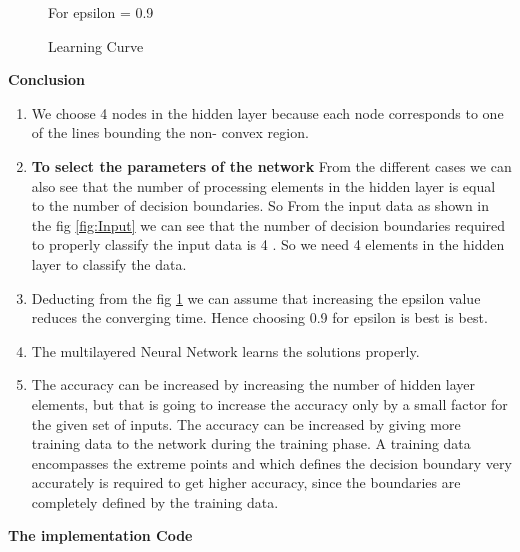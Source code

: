 \documentclass[10pt, letterpaper]{article}
\begin{document}
\begin{enumerate}
\begin{figure}[h!]
\caption{For epsilon = 0.9}
\caption{Learning Curve}
\label{fig:LearningRate}
\end{figure}


\end{enumerate}

\textbf{Conclusion}
\begin{enumerate}
\item We choose 4 nodes in the hidden layer because each node corresponds to one of the lines bounding the non- convex region.
\item \textbf{To select the parameters of the network}
From the different cases we can also see that the number of processing elements in the hidden layer is equal to the number of decision boundaries. So From the input data as shown in the fig \ref{fig:Input}  we can see that the number of decision boundaries required to properly classify the input data is 4 . So we need 4 elements in the hidden layer to classify the data. 
\item Deducting from the fig \ref{fig:LearningRate} we can assume that increasing the epsilon value reduces the converging time. Hence choosing 0.9 for epsilon is best is best.
\item The multilayered Neural Network learns the solutions properly.
\item The accuracy can be increased by increasing the number of hidden layer elements, but that is going to increase the accuracy only by a small factor for the given set of inputs. The accuracy can be increased by giving more training data to the network during the training phase.  A training data encompasses the extreme points and which defines the decision boundary very accurately is required to get higher accuracy, since the boundaries are completely defined by the training data. 
\end{enumerate}
\newpage
\textbf{The implementation Code}
\end{document}
